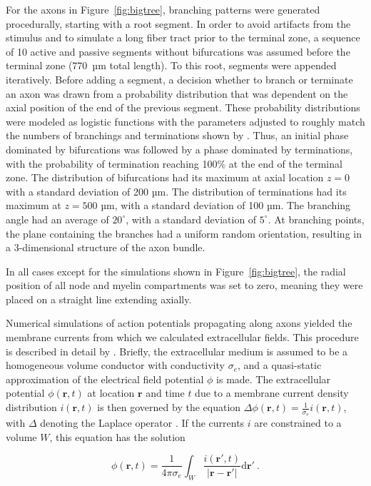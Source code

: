 \documentclass[]{elife}
\begin{document}
For the axons in Figure~\ref{fig:bigtree}, branching patterns were
generated procedurally, starting with a root segment. In order to avoid
artifacts from the stimulus and to simulate a long fiber tract prior to
the terminal zone, a sequence of 10 active and passive segments without
bifurcations was assumed before the terminal zone (770~µm total length).
To this root, segments were appended iteratively. Before adding a
segment, a decision whether to branch or terminate an axon was drawn
from a probability distribution that was dependent on the axial position
of the end of the previous segment. These probability distributions were
modeled as logistic functions with the parameters adjusted to roughly
match the numbers of branchings and terminations shown by
\citet{carr90}. Thus, an initial phase dominated by bifurcations was
followed by a phase dominated by terminations, with the probability of
termination reaching 100\% at the end of the terminal zone. The
distribution of bifurcations had its maximum at axial location \(z=0\)
with a standard deviation of 200 µm. The distribution of terminations
had its maximum at \(z=500\) µm, with a standard deviation of 100 µm.
The branching angle had an average of \(20^\circ\), with a standard
deviation of \(5^\circ\). At branching points, the plane containing the
branches had a uniform random orientation, resulting in a 3-dimensional
structure of the axon bundle.

In all cases except for the simulations shown in
Figure~\ref{fig:bigtree}, the radial position of all node and myelin
compartments was set to zero, meaning they were placed on a straight
line extending axially.

Numerical simulations of action potentials propagating along axons
yielded the membrane currents from which we calculated extracellular
fields. This procedure is described in detail by \citet{Gold2006Origin}.
Briefly, the extracellular medium is assumed to be a homogeneous volume
conductor with conductivity \(\sigma_e\), and a quasi-static
approximation of the electrical field potential \(\phi\) is made. The
extracellular potential \(\phi(\mathbf{r},t)\) at location
\(\mathbf{r}\) and time \(t\) due to a membrane current density
distribution \(i(\mathbf{r},t)\) is then governed by the equation
\(\Delta \phi(\mathbf{r},t) = \frac{1}{\sigma_e} i(\mathbf{r},t)\), with
\(\Delta\) denoting the Laplace operator \citep{Nunez2006Electric}. If
the currents \(i\) are constrained to a volume \(W\), this equation has
the solution

\begin{equation}
\phi(\mathbf{r},t)=\frac{1}{4\pi\sigma_{e}}\int_{W}\frac{i(\mathbf{r}',t)}{|\mathbf{r}-\mathbf{r}'|}\textrm{d}\mathbf{r}' \ .
\label{eqn:basic}
\end{equation}
\end{document}
